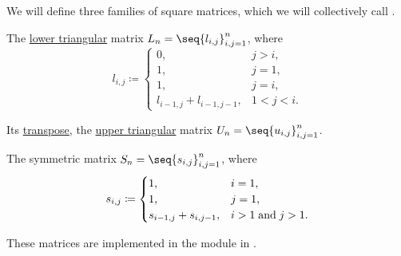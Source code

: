 \begin{definition}\label{def:pascal_matrix}
  We will define three families of square matrices, which we will collectively call .
  \begin{thmenum}
     The \hyperref[def:triangular_matrix]{lower triangular} matrix \( L_n = \seq{ l_{i,j} }_{i,j=1}^n \), where
    \begin{equation*}
      l_{i,j} \coloneqq \begin{cases}
        0,                       &j > i, \\
        1,                       &j = 1, \\
        1,                       &j = i, \\
        l_{i-1,j} + l_{i-1,j-1}, &1 < j < i.
      \end{cases}
    \end{equation*}

     Its \hyperref[def:transpose_matrix]{transpose}, the \hyperref[def:triangular_matrix]{upper triangular} matrix \( U_n = \seq{ u_{i,j} }_{i,j=1}^n \).

     The symmetric matrix \( S_n = \seq{ s_{i,j} }_{i,j=1}^n \), where
    \begin{equation*}
      s_{i,j} \coloneqq \begin{cases}
        1,                     &i = 1, \\
        1,                     &j = 1, \\
        s_{i-1,j} + s_{i,j-1}, &i > 1 \T{and} j > 1.
      \end{cases}
    \end{equation*}
  \end{thmenum}
\end{definition}
\begin{comments}
  \item These matrices are implemented in the module  in \cite{notebook:code}.
\end{comments}

